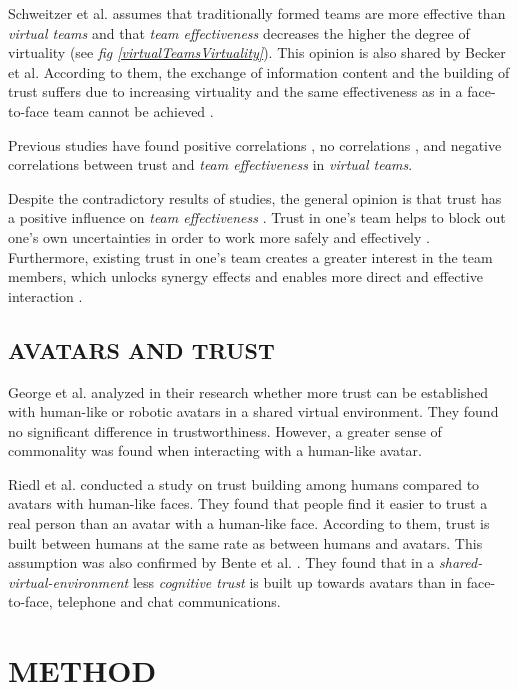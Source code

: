 \documentclass[sigchi]{acmart}
\begin{document}
Schweitzer et al. \citep{schweitzer2010conceptualizing} assumes that traditionally formed teams are more effective than \textit{virtual teams} and that \textit{team effectiveness} decreases the higher the degree of virtuality (see \textit{fig \ref{virtualTeamsVirtuality}}).
This opinion is also shared by Becker et al. According to them, the exchange of information content and the building of trust suffers due to increasing virtuality and the same effectiveness as in a face-to-face team cannot be achieved \citep{becker2002fuhrung}.

Previous studies have found positive correlations \citep{davis2000trusted}, no correlations \citep{hertel2004managing}, and negative correlations \citep{dirks1999effects} between trust and \textit{team effectiveness} in \textit{virtual teams}.

Despite the contradictory results of studies, the general opinion is that trust has a positive influence on \textit{team effectiveness} \citep{en2016trust}. 
Trust in one's team helps to block out one's own uncertainties in order to work more safely and effectively \citep{de2010does}. Furthermore, existing trust in one's team creates a greater interest in the team members, which unlocks synergy effects and enables more direct and effective interaction \citep{dirks1999effects}. 

\subsection{AVATARS AND TRUST}
George et al. \citep{george2018trusting} analyzed in their research whether more trust can be established with human-like or robotic avatars in a shared virtual environment. They found no significant difference in trustworthiness. However, a greater sense of commonality was found when interacting with a human-like avatar.

Riedl et al. \citep{riedl2014trusting} conducted a study on trust building among humans compared to avatars with human-like faces. They found that people find it easier to trust a real person than an avatar with a human-like face. According to them, trust is built between humans at the same rate as between humans and avatars.
This assumption was also confirmed by Bente et al. \citep[S. 54-59]{bente2004social}. They found that in a \textit{shared-virtual-environment} less \textit{cognitive trust} is built up towards avatars than in face-to-face, telephone and chat communications.

\section{METHOD}
\end{document}
